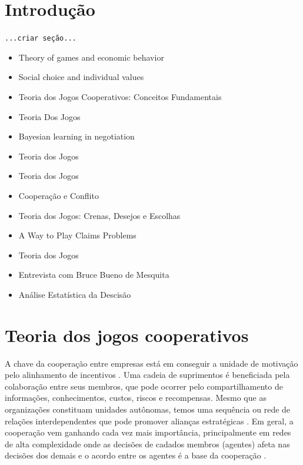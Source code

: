 \documentclass[
	article,			        %
	11pt,				          %
	oneside,			        %
	a4paper,			        %
	english,			        %
	brazil,				        %
	sumario=tradicional
]{abntex2}\usepackage[]{graphicx}\usepackage[]{color}
\begin{document}
\section*{Introdução}

\texttt{\color{red}...criar seção...}

  \begin{itemize}
    \item Theory of games and economic behavior \cite{Neumann.1947}
    \item Social choice and individual values \cite{Figueiredo.1994}
    \item Teoria dos Jogos Cooperativos: Conceitos Fundamentais \cite{Moreira.2002}
    \item Teoria Dos Jogos \cite{Fiani.2006}
    \item Bayesian learning in negotiation \cite{Zeng.1998}
    \item Teoria dos Jogos \cite{Tavares.2009}
    \item Teoria dos Jogos \cite{Bierman.2010}
    \item Coopera\c{c}{\~a}o e Conflito \cite{Fiani.2011}
    \item Teoria dos Jogos: Crenas, Desejos e Escolhas \cite{Paula.2014}
    \item A Way to Play Claims Problems \cite{Gimenez.2014}
    \item Teoria dos Jogos \cite{Fiani.2015}
    \item Entrevista com Bruce Bueno de Mesquita \cite{Mesquita.2012}
    \item Análise Estatística da Descisão \cite[p.~122--140]{Otto.2009}
  \end{itemize}

\section{Teoria dos jogos cooperativos}

A chave da cooperação entre empresas está em conseguir a unidade de motivação pelo alinhamento de incentivos \cite{Cao.2012}. Uma cadeia de suprimentos é beneficiada pela colaboração entre seus membros, que pode ocorrer pelo compartilhamento de informações, conhecimentos, custos, riscos e recompensas. Mesmo que as organizações constituam unidades autônomas, temos uma sequência ou rede de relações interdependentes que pode promover alianças estratégicas \cite{Chen.2004}. Em geral, a cooperação vem ganhando cada vez mais importância, principalmente em redes de alta complexidade \cite{Drechsel.2010} onde as decisões de cadados membros (agentes) afeta nas decisões dos demais e o acordo entre os agentes é a base da cooperação \cite{Young.1994}.
\end{document}
